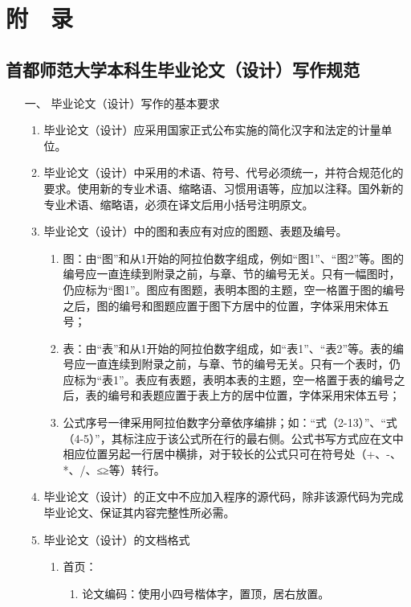 \chapter{附$\quad$录}
\label{chap:appendix}
\section{首都师范大学本科生毕业论文（设计）写作规范}
\begin{itemize}[font=\cusong]
\item[一、] {\cusong 毕业论文（设计）写作的基本要求}
\begin{enumerate}
\item 毕业论文（设计）应采用国家正式公布实施的简化汉字和法定的计量单位。
\item 毕业论文（设计）中采用的术语、符号、代号必须统一，并符合规范化的要求。使用新的专业术语、缩略语、习惯用语等，应加以注释。国外新的专业术语、缩略语，必须在译文后用小括号注明原文。
\item 毕业论文（设计）中的图和表应有对应的图题、表题及编号。
	\begin{enumerate}[label=(\arabic* )]
		\item 
图：由“图”和从1开始的阿拉伯数字组成，例如“图1”、“图2”等。图的编号应一直连续到附录之前，与章、节的编号无关。只有一幅图时，仍应标为“图1”。图应有图题，表明本图的主题，空一格置于图的编号之后，图的编号和图题应置于图下方居中的位置，字体采用宋体五号；
		\item 
表：由“表”和从1开始的阿拉伯数字组成，如“表1”、“表2”等。表的编号应一直连续到附录之前，与章、节的编号无关。只有一个表时，仍应标为“表1”。表应有表题，表明本表的主题，空一格置于表的编号之后，表的编号和表题应置于表上方的居中位置，字体采用宋体五号；
		\item 
公式序号一律采用阿拉伯数字分章依序编排；如：“式（2-13）”、“式（4-5）”，其标注应于该公式所在行的最右侧。公式书写方式应在文中相应位置另起一行居中横排，对于较长的公式只可在符号处（+、-、*、/、≤≥等）转行。
	\end{enumerate}
\item 毕业论文（设计）的正文中不应加入程序的源代码，除非该源代码为完成毕业论文、保证其内容完整性所必需。
\item  毕业论文（设计）的文档格式
	\begin{enumerate}[label=(\arabic* )]%
\CTEXindent
		\item 首页：
		\begin{enumerate}[label=\Roman* .]%
\item 论文编码：使用小四号楷体字，置顶，居右放置。

\end{enumerate}
\end{enumerate}
\end{enumerate}
\end{itemize}
